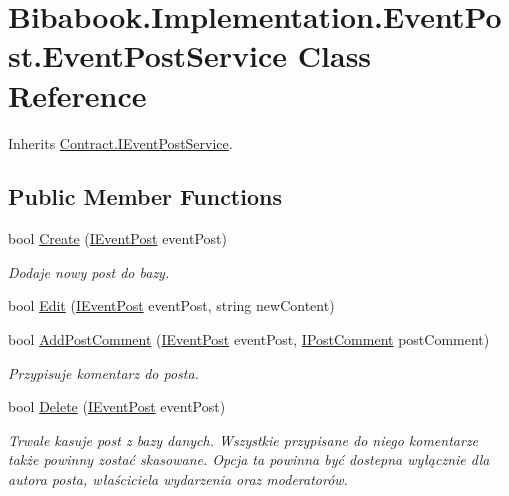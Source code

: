 \hypertarget{class_bibabook_1_1_implementation_1_1_event_post_1_1_event_post_service}{}\section{Bibabook.\+Implementation.\+Event\+Post.\+Event\+Post\+Service Class Reference}
\label{class_bibabook_1_1_implementation_1_1_event_post_1_1_event_post_service}


Inherits \hyperlink{interface_contract_1_1_i_event_post_service}{Contract.\+I\+Event\+Post\+Service}.

\subsection*{Public Member Functions}
\begin{DoxyCompactItemize}
\item 
bool \hyperlink{class_bibabook_1_1_implementation_1_1_event_post_1_1_event_post_service_ad2657b93d677033ccdbf2957281e0ea1}{Create} (\hyperlink{interface_contract_1_1_i_event_post}{I\+Event\+Post} event\+Post)
\begin{DoxyCompactList}\small\item\em Dodaje nowy post do bazy. \end{DoxyCompactList}\item 
bool \hyperlink{class_bibabook_1_1_implementation_1_1_event_post_1_1_event_post_service_afd957411d2f00bfc798f3647e17d878c}{Edit} (\hyperlink{interface_contract_1_1_i_event_post}{I\+Event\+Post} event\+Post, string new\+Content)
\item 
bool \hyperlink{class_bibabook_1_1_implementation_1_1_event_post_1_1_event_post_service_afcfcf99aa0a6a13868479ba42526a534}{Add\+Post\+Comment} (\hyperlink{interface_contract_1_1_i_event_post}{I\+Event\+Post} event\+Post, \hyperlink{interface_contract_1_1_i_post_comment}{I\+Post\+Comment} post\+Comment)
\begin{DoxyCompactList}\small\item\em Przypisuje komentarz do posta. \end{DoxyCompactList}\item 
bool \hyperlink{class_bibabook_1_1_implementation_1_1_event_post_1_1_event_post_service_a540d3592cb666ebc10f1f9a36a80269c}{Delete} (\hyperlink{interface_contract_1_1_i_event_post}{I\+Event\+Post} event\+Post)
\begin{DoxyCompactList}\small\item\em Trwale kasuje post z bazy danych. Wszystkie przypisane do niego komentarze także powinny zostać skasowane. Opcja ta powinna być dostepna wyłącznie dla autora posta, właściciela wydarzenia oraz moderatorów. \end{DoxyCompactList}\end{DoxyCompactItemize}



